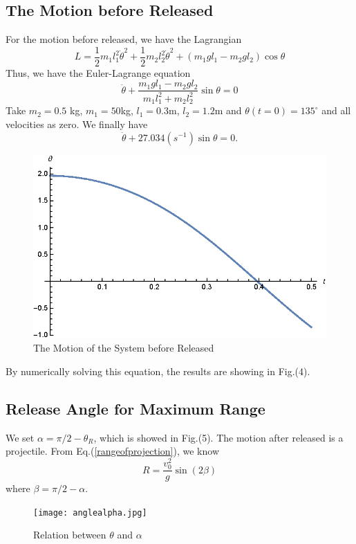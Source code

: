 \documentclass[%
reprint,
amsmath,amssymb,
aps,
]{revtex4-1}
\begin{document}
	\subsection{The Motion before Released}
	For the motion before released, we have the Lagrangian
	\begin{equation}
	L=\frac{1}{2}m_1l_1^2\dot{\theta}^2+\frac{1}{2}m_2l_2^2\dot{\theta}^2+(m_1gl_1-m_2gl_2)\cos{\theta}
	\end{equation}
	Thus, we have the Euler-Lagrange equation
	\begin{equation}
	\ddot{\theta}+\frac{m_1gl_1-m_2gl_2}{m_1l_1^2+m_2l_2^2}\sin{\theta}=0
	\end{equation}
	Take $m_2 = 0.5$ kg, $m_1 = 50$kg, $l_1 = 0.3$m, $l_2 = 1.2$m and $\theta(t=0) = 135^\circ$ and all velocities
	as zero. We finally have
	\begin{equation}
	\ddot{\theta}+27.034(s^{-1})\sin\theta=0.
	\end{equation}
	\begin{figure}
		\centering
		\includegraphics[scale=0.8]{See-Saw.eps}
		\caption{The Motion of the System before Released}
	\end{figure}
	By numerically solving this equation, the results are showing in Fig.(4).
	\subsection{Release Angle for Maximum Range}
	We set $\alpha=\pi/2-\theta_R$, which is showed in Fig.(5).
	The motion after released is a projectile. From Eq.(\ref{rangeofprojection}), we know
	\begin{equation}
	R=\frac{v_0^2}{g}\sin(2\beta)
	\end{equation}
	where $\beta=\pi/2-\alpha$.
	\begin{figure}
		\centering
		\texttt{[image: anglealpha.jpg]}
		\caption{Relation between $\theta$ and $\alpha$}
	\end{figure}
	
\end{document}
